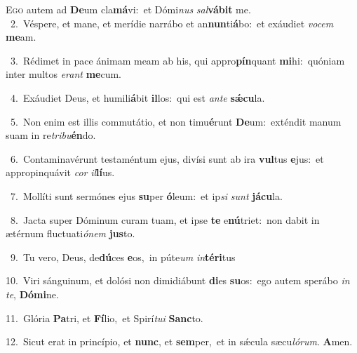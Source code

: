 \lettrine{\initial\textcolor{\initialcolor}{E}}{go} autem ad \textbf{De}\-um cla\-\textbf{má}\-vi:~\star et Dómi\textit{nus} \textit{sal}\-\textbf{vá}\textbf{bit} me.\\
{\numbfont\textcolor{\numbcolor}{~2.}}~Véspere, et mane, et merídie narrábo et an\-\textbf{nun}\-ti\-\textbf{á}\-bo:~\star et exáudiet \textit{vo}\-\textit{cem} \textbf{me}\-am.\par
{\numbfont\textcolor{\numbcolor}{~3.}}~Rédimet in pace ánimam meam ab his, qui appro\-\textbf{pín}\-quant \textbf{mi}\-hi:~\star quóniam inter multos \textit{e}\-\textit{rant} \textbf{me}\-cum.\par
{\numbfont\textcolor{\numbcolor}{~4.}}~Exáudiet Deus, et humili\-\textbf{á}\-bit \textbf{il}\-los:~\star qui est \textit{an}\-\textit{te} \textbf{sǽ}\-\textbf{cu}la.\par
{\numbfont\textcolor{\numbcolor}{~5.}}~Non enim est illis commutátio, et non timu\-\textbf{é}\-runt \textbf{De}\-um:~\star exténdit manum suam in re\-\textit{tri}\-\textit{bu}\textbf{én}do.\par
{\numbfont\textcolor{\numbcolor}{~6.}}~Contaminavérunt testaméntum ejus, divísi sunt ab ira \textbf{vul}\-tus \textbf{e}\-jus:~\star et appropinquávit \textit{cor} \textit{il}\-\textbf{lí}us.\par
{\numbfont\textcolor{\numbcolor}{~7.}}~Mollíti sunt sermónes ejus \textbf{su}\-per \textbf{ó}\-leum:~\star et ip\textit{si} \textit{sunt} \textbf{já}\-\textbf{cu}la.\par
{\numbfont\textcolor{\numbcolor}{~8.}}~Jacta super Dóminum curam tuam, et ipse \textbf{te} e\-\textbf{nú}\-triet:~\star non dabit in ætérnum fluctuati\-\textit{ó}\-\textit{nem} \textbf{jus}\-to.\par
{\numbfont\textcolor{\numbcolor}{~9.}}~Tu vero, Deus, de\-\textbf{dú}\-ces \textbf{e}\-os,~\star in púte\textit{um} \textit{in}\-\textbf{tér}\textbf{i}tus\par
{\numbfont\textcolor{\numbcolor}{10.}}~Viri sánguinum, et dolósi non dimidiábunt \textbf{di}\-es \textbf{su}\-os:~\star ego autem sperábo \textit{in} \textit{te}\-, \textbf{Dó}\-\textbf{mi}ne.\par
{\numbfont\textcolor{\numbcolor}{11.}}~Glória \textbf{Pa}\-tri, et \textbf{Fí}\-lio,~\star et Spirí\-\textit{tu}\-\textit{i} \textbf{Sanc}\-to.\par
{\numbfont\textcolor{\numbcolor}{12.}}~Sicut erat in princípio, et \textbf{nunc}\-, et \textbf{sem}\-per,~\star et in sǽcula sæcu\-\textit{ló}\-\textit{rum}. \textbf{A}\-men.\par
